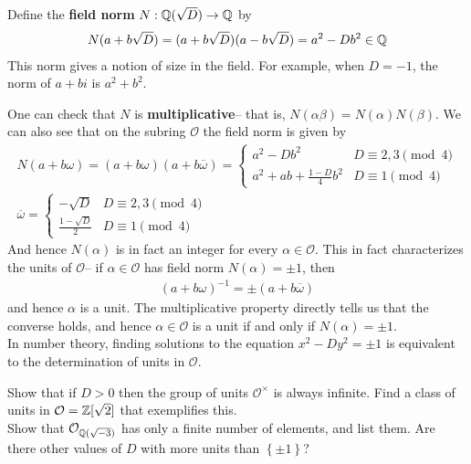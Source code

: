 \documentclass{memoir}
\begin{document}
\begin{defn}
	Define the \textbf{field norm} \(N:\mathbb{Q}(\sqrt{D} ) \to \mathbb{Q}\) by
	\begin{align*}
		N(a+b\sqrt{D} ) = (a+b\sqrt{D} )(a-b\sqrt{D} ) = a^2 - Db^2 \in \mathbb{Q}
	\end{align*}
	This norm gives a notion of size in the field. For example, when \(D=-1\), the norm of \(a+bi\) is \(a^2+b^2\).
\end{defn}
One can check that \(N\) is \textbf{multiplicative}-- that is, \(N(\alpha \beta ) = N(\alpha )N(\beta )\). We can also see that on the subring \(\mathcal{O}\) the field norm is given by
\begin{align*}
	N(a+b\omega ) = (a+b\omega )(a+b \overline{\omega }) = \begin{cases}
		a^2-Db^2 & D \equiv 2,3 \pmod{4}\\
		a^2+ab + \frac{1-D}{4}b^2 & D \equiv 1 \pmod{4}
	\end{cases}\\
	\overline{\omega } = \begin{cases}
		-\sqrt{D} & D \equiv 2,3 \pmod{4}\\
		\frac{1-\sqrt{D} }{2} & D \equiv 1 \pmod{4}
	\end{cases}
\end{align*}
And hence \(N(\alpha )\) is in fact an integer for every \(\alpha  \in \mathcal{O}\). This in fact characterizes the units of \(\mathcal{O}\)-- if \(\alpha \in \mathcal{O}\) has field norm \(N(\alpha ) = \pm 1\), then
\begin{align*}
	(a + b\omega )^{-1} = \pm (a + b \overline{\omega })
\end{align*}
and hence \(\alpha \) is a unit. The multiplicative property directly tells us that the converse holds, and hence \(\alpha \in \mathcal{O}\) is a unit if and only if \(N(\alpha ) = \pm 1\).\\

In number theory, finding solutions to the equation \(x^2-Dy^2 = \pm 1\) is equivalent to the determination of units in \(\mathcal{O}\).

\begin{hw}
	Show that if \(D>0\) then the group of units \(\mathcal{O}^{\times }\) is always infinite. Find a class of units in \(\mathcal{O} = \mathbb{Z}[\sqrt{2} ]\) that exemplifies this.\\

	Show that \(\mathcal{O}_{\mathbb{Q}(\sqrt{-3} )}\) has only a finite number of elements, and list them. Are there other values of \(D\) with more units than \(\left\{ \pm 1 \right\} \)?
\end{hw}
\end{document}
